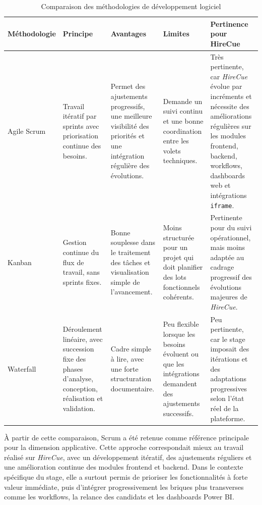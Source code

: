 \begin{table}[H]
\centering
\small
\renewcommand{\arraystretch}{1.25}
\begin{tabular}{|p{2.8cm}|p{2.8cm}|p{3.1cm}|p{3cm}|p{3.3cm}|}
\hline
\rowcolor{TableHeaderBlue}
\textbf{Méthodologie} & \textbf{Principe} & \textbf{Avantages} & \textbf{Limites} & \textbf{Pertinence pour HireCue} \\
\hline
Agile Scrum & Travail itératif par sprints avec priorisation continue des besoins. & Permet des ajustements progressifs, une meilleure visibilité des priorités et une intégration régulière des évolutions. & Demande un suivi continu et une bonne coordination entre les volets techniques. & Très pertinente, car \textit{HireCue} évolue par incréments et nécessite des améliorations régulières sur les modules frontend, backend, workflows, dashboards web et intégrations \texttt{iframe}. \\
\hline
Kanban & Gestion continue du flux de travail, sans sprints fixes. & Bonne souplesse dans le traitement des tâches et visualisation simple de l'avancement. & Moins structurée pour un projet qui doit planifier des lots fonctionnels cohérents. & Pertinente pour du suivi opérationnel, mais moins adaptée au cadrage progressif des évolutions majeures de \textit{HireCue}. \\
\hline
Waterfall & Déroulement linéaire, avec succession fixe des phases d'analyse, conception, réalisation et validation. & Cadre simple à lire, avec une forte structuration documentaire. & Peu flexible lorsque les besoins évoluent ou que les intégrations demandent des ajustements successifs. & Peu pertinente, car le stage imposait des itérations et des adaptations progressives selon l'état réel de la plateforme. \\
\hline
\end{tabular}
\caption{Comparaison des méthodologies de développement logiciel}
\end{table}
\normalsize

À partir de cette comparaison, Scrum a été retenue comme référence principale pour la dimension applicative. Cette approche correspondait mieux au travail réalisé sur \textit{HireCue}, avec un développement itératif, des ajustements réguliers et une amélioration continue des modules frontend et backend. Dans le contexte spécifique du stage, elle a surtout permis de prioriser les fonctionnalités à forte valeur immédiate, puis d'intégrer progressivement les briques plus transverses comme les workflows, la relance des candidats et les dashboards Power BI.

